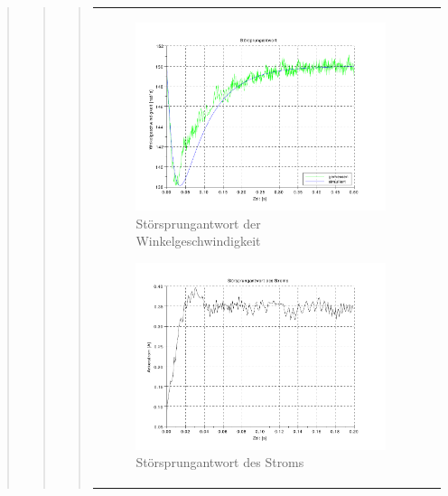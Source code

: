 \begin{quote}
\begin{quote}
\begin{quote}
\begin{center}
\begin{tabular}{ll}
\begin{minipage}{0.6\textwidth}
                \begin{figure}[H]
                    \label{fig:stoersprung_w}
                    \includegraphics[scale=0.7, trim = 8mm 5mm 15mm 10mm, clip]{Bilder/stoersprung_w}
                    \caption{Störsprungantwort der Winkelgeschwindigkeit}
                \end{figure}
                
            \end{minipage}
            
            \begin{minipage}{0.6\textwidth}
                \begin{figure}[H]
                    \label{fig:stoersprung_i}
                    \includegraphics[scale=0.7, trim = 8mm 5mm 15mm 10mm, clip]{Bilder/stoersprung_i}
                    \caption{Störsprungantwort des Stroms}
                \end{figure}
                

\end{minipage}
\end{tabular}
\end{center}
\end{quote}
\end{quote}
\end{quote}

